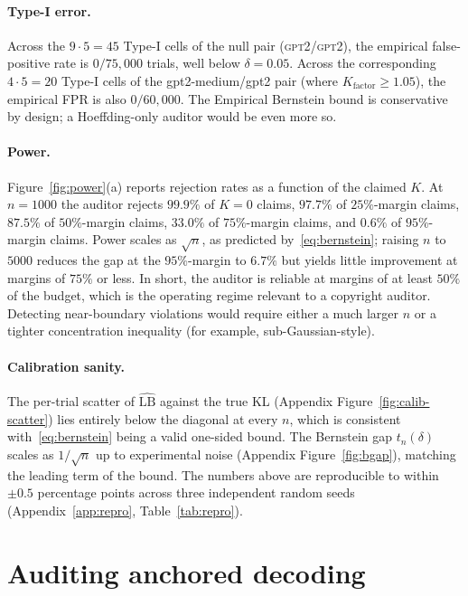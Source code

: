 \documentclass{article}
\begin{document}
\paragraph{Type-I error.}
Across the $9\cdot 5=45$ Type-I cells of the null pair (\textsc{gpt2}/\textsc{gpt2}), the empirical false-positive rate is \textbf{$0/75{,}000$} trials, well below $\delta=0.05$.  Across the corresponding $4\cdot 5=20$ Type-I cells of the gpt2-medium/gpt2 pair (where $K_{\mathrm{factor}}\ge 1.05$), the empirical FPR is also $0/60{,}000$.  The Empirical Bernstein bound is conservative by design; a Hoeffding-only auditor would be even more so.

\paragraph{Power.}
Figure~\ref{fig:power}(a) reports rejection rates as a function of the claimed $K$.  At $n=1000$ the auditor rejects $99.9\%$ of $K=0$ claims, $97.7\%$ of $25\%$-margin claims, $87.5\%$ of $50\%$-margin claims, $33.0\%$ of $75\%$-margin claims, and $0.6\%$ of $95\%$-margin claims.  Power scales as $\sqrt n$, as predicted by~\eqref{eq:bernstein}; raising $n$ to $5000$ reduces the gap at the $95\%$-margin to $6.7\%$ but yields little improvement at margins of $75\%$ or less.  In short, the auditor is reliable at margins of at least $50\%$ of the budget, which is the operating regime relevant to a copyright auditor.  Detecting near-boundary violations would require either a much larger $n$ or a tighter concentration inequality (for example, sub-Gaussian-style).

\paragraph{Calibration sanity.}
The per-trial scatter of $\widehat{\mathrm{LB}}$ against the true KL (Appendix Figure~\ref{fig:calib-scatter}) lies entirely below the diagonal at every $n$, which is consistent with~\eqref{eq:bernstein} being a valid one-sided bound.  The Bernstein gap $t_n(\delta)$ scales as $1/\sqrt n$ up to experimental noise (Appendix Figure~\ref{fig:bgap}), matching the leading term of the bound.  The numbers above are reproducible to within $\pm 0.5$ percentage points across three independent random seeds (Appendix~\ref{app:repro}, Table~\ref{tab:repro}).


\section{Auditing anchored decoding}
\label{sec:anchored}
\end{document}

